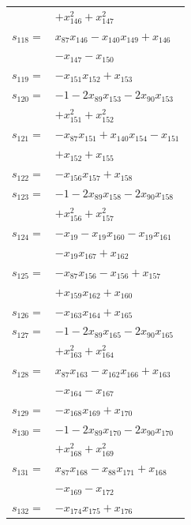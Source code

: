 \begin{longtable}{@{}r@{\;}l@{}}
 & \(\displaystyle +x_{146}^{2} +x_{147}^{2}\) \\[3pt]
\(s_{118}=\) & \(\displaystyle x_{87}x_{146} -x_{140}x_{149} +x_{146}\) \\
 & \(\displaystyle -x_{147} -x_{150}\) \\[3pt]
\(s_{119}=\) & \(\displaystyle -x_{151}x_{152} +x_{153}\) \\[3pt]
\(s_{120}=\) & \(\displaystyle -1 -2x_{89}x_{153} -2x_{90}x_{153}\) \\
 & \(\displaystyle +x_{151}^{2} +x_{152}^{2}\) \\[3pt]
\(s_{121}=\) & \(\displaystyle -x_{87}x_{151} +x_{140}x_{154} -x_{151}\) \\
 & \(\displaystyle +x_{152} +x_{155}\) \\[3pt]
\(s_{122}=\) & \(\displaystyle -x_{156}x_{157} +x_{158}\) \\[3pt]
\(s_{123}=\) & \(\displaystyle -1 -2x_{89}x_{158} -2x_{90}x_{158}\) \\
 & \(\displaystyle +x_{156}^{2} +x_{157}^{2}\) \\[3pt]
\(s_{124}=\) & \(\displaystyle -x_{19} -x_{19}x_{160} -x_{19}x_{161}\) \\
 & \(\displaystyle -x_{19}x_{167} +x_{162}\) \\[3pt]
\(s_{125}=\) & \(\displaystyle -x_{87}x_{156} -x_{156} +x_{157}\) \\
 & \(\displaystyle +x_{159}x_{162} +x_{160}\) \\[3pt]
\(s_{126}=\) & \(\displaystyle -x_{163}x_{164} +x_{165}\) \\[3pt]
\(s_{127}=\) & \(\displaystyle -1 -2x_{89}x_{165} -2x_{90}x_{165}\) \\
 & \(\displaystyle +x_{163}^{2} +x_{164}^{2}\) \\[3pt]
\(s_{128}=\) & \(\displaystyle x_{87}x_{163} -x_{162}x_{166} +x_{163}\) \\
 & \(\displaystyle -x_{164} -x_{167}\) \\[3pt]
\(s_{129}=\) & \(\displaystyle -x_{168}x_{169} +x_{170}\) \\[3pt]
\(s_{130}=\) & \(\displaystyle -1 -2x_{89}x_{170} -2x_{90}x_{170}\) \\
 & \(\displaystyle +x_{168}^{2} +x_{169}^{2}\) \\[3pt]
\(s_{131}=\) & \(\displaystyle x_{87}x_{168} -x_{88}x_{171} +x_{168}\) \\
 & \(\displaystyle -x_{169} -x_{172}\) \\[3pt]
\(s_{132}=\) & \(\displaystyle -x_{174}x_{175} +x_{176}\) \\[3pt]

\end{longtable}

